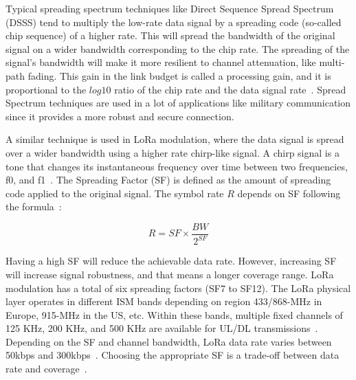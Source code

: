 \documentclass[]{IEEEtran}
\begin{document}
Typical spreading spectrum techniques like Direct Sequence Spread Spectrum (DSSS) tend to multiply the low-rate data signal by a spreading code (so-called chip sequence) of a higher rate.
This will spread the bandwidth of the original signal on a wider bandwidth corresponding to the chip rate.
The spreading of the signal's bandwidth will make it more resilient to channel attenuation, like multi-path fading.
This gain in the link budget is called a processing gain, and it is proportional to the $log10$ ratio of the chip rate and the data signal rate~\cite{LoRaWAN_semtech}.
Spread Spectrum techniques are used in a lot of applications like military communication since it provides a more robust and secure connection.

A similar technique is used in LoRa modulation, where the data signal is spread over a wider bandwidth using a higher rate chirp-like signal.
A chirp signal is a tone that changes its instantaneous frequency over time between two frequencies, f0, and f1~\cite{haxhibeqiri2018survey}. The Spreading Factor (SF) is defined as the amount of spreading code applied to the original signal.
The symbol rate $R$ depends on SF following the formula~\cite{vangelista2017frequency}:

\begin{equation}
R=SF\times \frac{BW}{2^{SF}}
\label{equ:SF-Rate}
\end{equation}

Having a high SF will reduce the achievable data rate.
However, increasing SF will increase signal robustness, and that means a longer coverage range.
LoRa modulation has a total of six spreading factors (SF7 to SF12).
The LoRa physical layer operates in different ISM bands depending on region 433/868-MHz in Europe, 915-MHz in the US, etc.
Within these bands, multiple fixed channels of 125 KHz, 200 KHz, and 500 KHz are available for UL/DL transmissions~\cite{adelantado2017understanding}.
Depending on the SF and channel bandwidth, LoRa data rate varies between 50kbps and 300kbps~\cite{LoRaWAN_spec}.
Choosing the appropriate SF is a trade-off between data rate and coverage~\cite{boisgueneSurveyNBIoTDownlink2017}.
\end{document}
